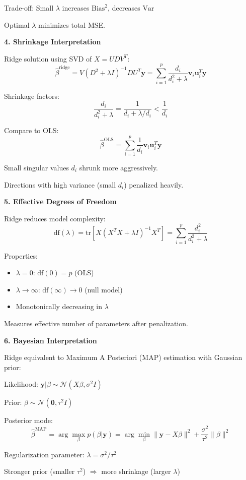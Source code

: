 \documentclass[12pt]{article}
\begin{document}
\begin{explanation}
Trade-off: Small $\lambda$ increases $\text{Bias}^2$, decreases $\text{Var}$

Optimal $\lambda$ minimizes total MSE.

\textbf{4. Shrinkage Interpretation}

Ridge solution using SVD of $X = UDV^T$:
\[\hat{\beta}^{\text{ridge}} = V(D^2 + \lambda I)^{-1}DU^T\mathbf{y} = \sum_{i=1}^{p} \frac{d_i}{d_i^2 + \lambda} \mathbf{v}_i \mathbf{u}_i^T \mathbf{y}\]

Shrinkage factors:
\[\frac{d_i}{d_i^2 + \lambda} = \frac{1}{d_i + \lambda/d_i} < \frac{1}{d_i}\]

Compare to OLS:
\[\hat{\beta}^{\text{OLS}} = \sum_{i=1}^{p} \frac{1}{d_i} \mathbf{v}_i \mathbf{u}_i^T \mathbf{y}\]

Small singular values $d_i$ shrunk more aggressively.

Directions with high variance (small $d_i$) penalized heavily.

\textbf{5. Effective Degrees of Freedom}

Ridge reduces model complexity:
\[\text{df}(\lambda) = \text{tr}[X(X^TX + \lambda I)^{-1}X^T] = \sum_{i=1}^{p} \frac{d_i^2}{d_i^2 + \lambda}\]

Properties:
\begin{itemize}
\item $\lambda = 0$: $\text{df}(0) = p$ (OLS)
\item $\lambda \to \infty$: $\text{df}(\infty) \to 0$ (null model)
\item Monotonically decreasing in $\lambda$
\end{itemize}

Measures effective number of parameters after penalization.

\textbf{6. Bayesian Interpretation}

Ridge equivalent to Maximum A Posteriori (MAP) estimation with Gaussian prior:

Likelihood: $\mathbf{y} | \beta \sim \mathcal{N}(X\beta, \sigma^2 I)$

Prior: $\beta \sim \mathcal{N}(\mathbf{0}, \tau^2 I)$

Posterior mode:
\[\hat{\beta}^{\text{MAP}} = \arg\max_{\beta} p(\beta | \mathbf{y}) = \arg\min_{\beta} \|\mathbf{y} - X\beta\|^2 + \frac{\sigma^2}{\tau^2}\|\beta\|^2\]

Regularization parameter: $\lambda = \sigma^2/\tau^2$

Stronger prior (smaller $\tau^2$) $\Rightarrow$ more shrinkage (larger $\lambda$)


\end{explanation}
\end{document}
